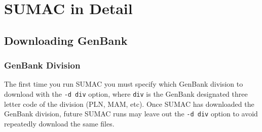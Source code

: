 \documentclass[10pt]{report}
\begin{document}
\iffalse
The \verb|alignments/combined.fasta| is the final aligned supermatrix in FASTA format.
\verb|alignments/N.fasta|, where $N$ is an integer $> 0$, is the alignment of gene region $N$.
Similarly, \verb|clusters/N.fasta| is the unaligned raw sequence cluster of gene region $N$.
The \verb|gb_search_results| file is used by SUMAC to save the results of the GenBank
sequence search in case the search is re-run. This file is not human readable.

The two CSV (comma-separated values) files contain tables that provide useful
summary information about the supermatrix. \verb|genbank_accessions.csv| is a table
with each GenBank accession used, ordered by gene region and taxon (like the
appendices found in most systematics papers). The \verb|gene_regions.csv|
file contains the number of taxa, the aligned length, the percent missing data,
and the taxon coverage density of each gene region used in the supermatrix.

The \verb|plot.pdf| file is a figure that shows how much sequence data was available for
each taxon for each gene region.
\verb|sumac_log| is a log of the SUMAC run, and contains a great deal of information
about the supermatrix construction, including final metrics such as the partical
decisiveness (PD) of the supermatrix.
\fi


\chapter{SUMAC in Detail}

\section{Downloading GenBank}

\subsection{GenBank Division}

The first time you run SUMAC you must specify which GenBank division
to download with the \verb|-d div| option, where \verb|div| is the
GenBank designated three letter code of the division (PLN, MAM, etc).
Once SUMAC has downloaded the GenBank division, future SUMAC runs
may leave out the \verb|-d div| option to avoid repeatedly
download the same files.
\end{document}
